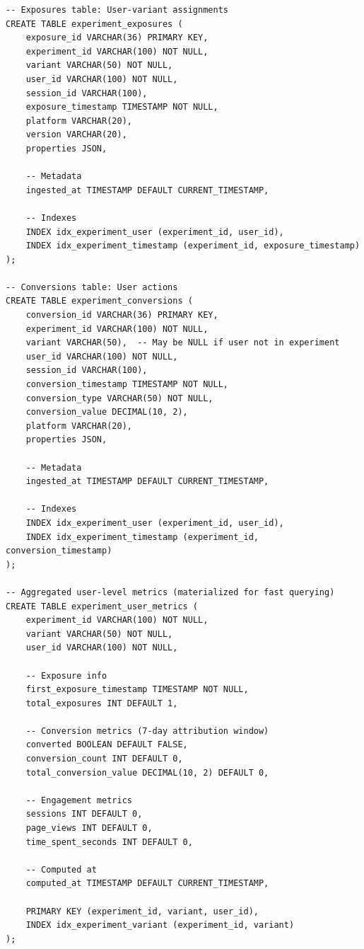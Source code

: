 \lstset{language=SQL, caption=Experiment Data Schema}
\begin{lstlisting}
-- Exposures table: User-variant assignments
CREATE TABLE experiment_exposures (
    exposure_id VARCHAR(36) PRIMARY KEY,
    experiment_id VARCHAR(100) NOT NULL,
    variant VARCHAR(50) NOT NULL,
    user_id VARCHAR(100) NOT NULL,
    session_id VARCHAR(100),
    exposure_timestamp TIMESTAMP NOT NULL,
    platform VARCHAR(20),
    version VARCHAR(20),
    properties JSON,

    -- Metadata
    ingested_at TIMESTAMP DEFAULT CURRENT_TIMESTAMP,

    -- Indexes
    INDEX idx_experiment_user (experiment_id, user_id),
    INDEX idx_experiment_timestamp (experiment_id, exposure_timestamp)
);

-- Conversions table: User actions
CREATE TABLE experiment_conversions (
    conversion_id VARCHAR(36) PRIMARY KEY,
    experiment_id VARCHAR(100) NOT NULL,
    variant VARCHAR(50),  -- May be NULL if user not in experiment
    user_id VARCHAR(100) NOT NULL,
    session_id VARCHAR(100),
    conversion_timestamp TIMESTAMP NOT NULL,
    conversion_type VARCHAR(50) NOT NULL,
    conversion_value DECIMAL(10, 2),
    platform VARCHAR(20),
    properties JSON,

    -- Metadata
    ingested_at TIMESTAMP DEFAULT CURRENT_TIMESTAMP,

    -- Indexes
    INDEX idx_experiment_user (experiment_id, user_id),
    INDEX idx_experiment_timestamp (experiment_id, conversion_timestamp)
);

-- Aggregated user-level metrics (materialized for fast querying)
CREATE TABLE experiment_user_metrics (
    experiment_id VARCHAR(100) NOT NULL,
    variant VARCHAR(50) NOT NULL,
    user_id VARCHAR(100) NOT NULL,

    -- Exposure info
    first_exposure_timestamp TIMESTAMP NOT NULL,
    total_exposures INT DEFAULT 1,

    -- Conversion metrics (7-day attribution window)
    converted BOOLEAN DEFAULT FALSE,
    conversion_count INT DEFAULT 0,
    total_conversion_value DECIMAL(10, 2) DEFAULT 0,

    -- Engagement metrics
    sessions INT DEFAULT 0,
    page_views INT DEFAULT 0,
    time_spent_seconds INT DEFAULT 0,

    -- Computed at
    computed_at TIMESTAMP DEFAULT CURRENT_TIMESTAMP,

    PRIMARY KEY (experiment_id, variant, user_id),
    INDEX idx_experiment_variant (experiment_id, variant)
);


\end{lstlisting}
